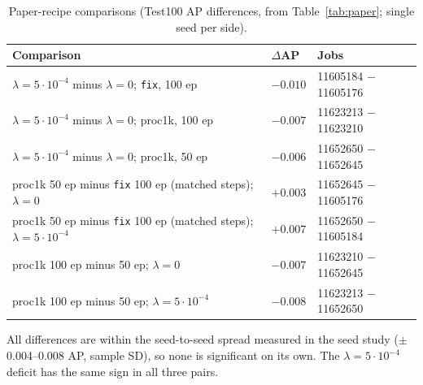 \documentclass[10pt]{article}
\begin{document}
\begin{table}[h]\centering\small
\begin{threeparttable}
\caption{Paper-recipe comparisons (Test100 AP differences, from Table~\ref{tab:paper}; single seed per side).}
\begin{tabularx}{\linewidth}{X l l}
\toprule
Comparison & $\Delta$AP & Jobs \\
\midrule
$\lambda=5\cdot10^{-4}$ minus $\lambda=0$; \texttt{fix}, 100 ep & $-0.010$ & 11605184 $-$ 11605176 \\
$\lambda=5\cdot10^{-4}$ minus $\lambda=0$; proc1k, 100 ep & $-0.007$ & 11623213 $-$ 11623210 \\
$\lambda=5\cdot10^{-4}$ minus $\lambda=0$; proc1k, 50 ep & $-0.006$ & 11652650 $-$ 11652645 \\
\addlinespace
proc1k 50 ep minus \texttt{fix} 100 ep (matched steps); $\lambda=0$ & $+0.003$ & 11652645 $-$ 11605176 \\
proc1k 50 ep minus \texttt{fix} 100 ep (matched steps); $\lambda=5\cdot10^{-4}$ & $+0.007$ & 11652650 $-$ 11605184 \\
\addlinespace
proc1k 100 ep minus 50 ep; $\lambda=0$ & $-0.007$ & 11623210 $-$ 11652645 \\
proc1k 100 ep minus 50 ep; $\lambda=5\cdot10^{-4}$ & $-0.008$ & 11623213 $-$ 11652650 \\
\bottomrule
\end{tabularx}
\begin{tablenotes}\footnotesize
\item All differences are within the seed-to-seed spread measured in the seed study ($\pm$0.004--0.008 AP, sample SD), so none is significant on its own. The $\lambda=5\cdot10^{-4}$ deficit has the same sign in all three pairs.
\end{tablenotes}
\end{threeparttable}
\end{table}
\end{document}
